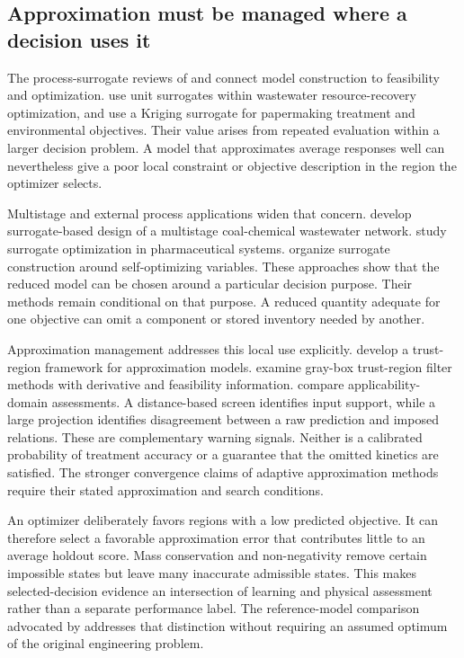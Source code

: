 \subsection{Approximation must be managed where a decision uses it}

The process-surrogate reviews of \citet{BhosekarIerapetritou2018} and \citet{McBride2019} connect model construction to feasibility and optimization. \citet{Durkin2024} use unit surrogates within wastewater resource-recovery optimization, and \citet{He2023} use a Kriging surrogate for papermaking treatment and environmental objectives. Their value arises from repeated evaluation within a larger decision problem. A model that approximates average responses well can nevertheless give a poor local constraint or objective description in the region the optimizer selects.

Multistage and external process applications widen that concern. \citet{Tang2026} develop surrogate-based design of a multistage coal-chemical wastewater network. \citet{Tsochatzidi2025} study surrogate optimization in pharmaceutical systems. \citet{StrausSkogestad2018} organize surrogate construction around self-optimizing variables. These approaches show that the reduced model can be chosen around a particular decision purpose. Their methods remain conditional on that purpose. A reduced quantity adequate for one objective can omit a component or stored inventory needed by another.

Approximation management addresses this local use explicitly. \citet{Alexandrov1998} develop a trust-region framework for approximation models. \citet{Hameed2026} examine gray-box trust-region filter methods with derivative and feasibility information. \citet{Sahigara2012} compare applicability-domain assessments. A distance-based screen identifies input support, while a large projection identifies disagreement between a raw prediction and imposed relations. These are complementary warning signals. Neither is a calibrated probability of treatment accuracy or a guarantee that the omitted kinetics are satisfied. The stronger convergence claims of adaptive approximation methods require their stated approximation and search conditions.

An optimizer deliberately favors regions with a low predicted objective. It can therefore select a favorable approximation error that contributes little to an average holdout score. Mass conservation and non-negativity remove certain impossible states but leave many inaccurate admissible states. This makes selected-decision evidence an intersection of learning and physical assessment rather than a separate performance label. The reference-model comparison advocated by \citet{Pedrozo2025} addresses that distinction without requiring an assumed optimum of the original engineering problem.

